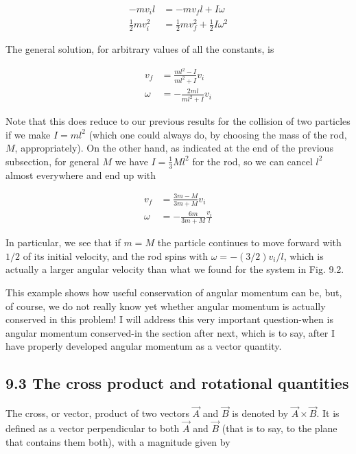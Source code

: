 \documentclass[10pt]{article}
\begin{document}
\begin{align*}
-m v_{i} l & =-m v_{f} l+I \omega \\
\frac{1}{2} m v_{i}^{2} & =\frac{1}{2} m v_{f}^{2}+\frac{1}{2} I \omega^{2} \tag{9.6}
\end{align*}


The general solution, for arbitrary values of all the constants, is


\begin{align*}
v_{f} & =\frac{m l^{2}-I}{m l^{2}+I} v_{i} \\
\omega & =-\frac{2 m l}{m l^{2}+I} v_{i} \tag{9.7}
\end{align*}


Note that this does reduce to our previous results for the collision of two particles if we make $I=m l^{2}$ (which one could always do, by choosing the mass of the rod, $M$, appropriately). On the other hand, as indicated at the end of the previous subsection, for general $M$ we have $I=\frac{1}{3} M l^{2}$ for the rod, so we can cancel $l^{2}$ almost everywhere and end up with


\begin{align*}
v_{f} & =\frac{3 m-M}{3 m+M} v_{i} \\
\omega & =-\frac{6 m}{3 m+M} \frac{v_{i}}{l} \tag{9.8}
\end{align*}


In particular, we see that if $m=M$ the particle continues to move forward with $1 / 2$ of its initial velocity, and the rod spins with $\omega=-(3 / 2) v_{i} / l$, which is actually a larger angular velocity than what we found for the system in Fig. 9.2.

This example shows how useful conservation of angular momentum can be, but, of course, we do not really know yet whether angular momentum is actually conserved in this problem! I will address this very important question-when is angular momentum conserved-in the section after next, which is to say, after I have properly developed angular momentum as a vector quantity.

\subsection*{9.3 The cross product and rotational quantities}
The cross, or vector, product of two vectors $\vec{A}$ and $\vec{B}$ is denoted by $\vec{A} \times \vec{B}$. It is defined as a vector perpendicular to both $\vec{A}$ and $\vec{B}$ (that is to say, to the plane that contains them both), with a magnitude given by
\end{document}

